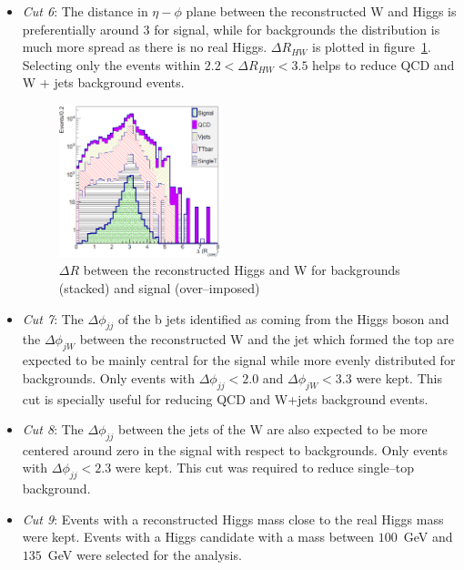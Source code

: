 \begin{itemize}
\item \textit{Cut 6}: The distance in $\eta-\phi$ plane between the reconstructed W and Higgs is preferentially around 3 for signal, while for backgrounds the distribution is much more spread as there is no real Higgs. $\Delta R_{HW}$ is plotted in figure~\ref{fig:Var3}. Selecting only the events within $2.2<\Delta R_{HW}<3.5$ helps to reduce QCD and W + jets background events.

\begin{figure}[!Hhtbp]
  \begin{center}
    \includegraphics[width=0.45\textwidth]{figs/Pheno/DRWH.png}
    \caption{$\Delta R$ between the reconstructed Higgs and W for backgrounds (stacked) and signal (over--imposed)}
    \label{fig:Var3}
  \end{center}
\end{figure}

\item \textit{Cut 7}: The $\Delta \phi_{jj}$ of the b jets identified as coming from the Higgs boson and the $\Delta \phi_{jW}$ between the reconstructed W and the jet which formed the top are expected to be mainly central for the signal while more evenly distributed for backgrounds. Only events with $\Delta \phi_{jj}<2.0$ and $\Delta \phi_{jW}<3.3$ were kept. This cut is specially useful for reducing QCD and W+jets background events.

\item \textit{Cut 8}: The $\Delta \phi_{jj}$ between the jets of the W are also expected to be more centered around zero in the signal with respect to backgrounds. Only events with $\Delta \phi_{jj}<2.3$ were kept. This cut was required to reduce single--top background.

\item \textit{Cut 9}: Events with a reconstructed Higgs mass close to the real Higgs mass were kept. Events with a Higgs candidate with a mass between $100$~GeV and $135$~GeV were selected for the analysis.


\end{itemize}
